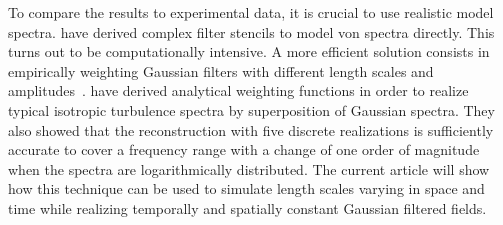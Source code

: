 To compare the results to experimental data, it is crucial to use realistic model spectra. \citet{dieste_random_2012} have derived complex filter stencils to model von \Karman spectra directly. This turns out to be computationally intensive. A more efficient solution consists in empirically weighting Gaussian filters with different length scales and amplitudes~\cite{kim_advanced_2015,hainaut_caa_2016}. \citet{wohlbrandt_analytical_2016} have derived analytical weighting functions in order to realize typical isotropic turbulence spectra by superposition of Gaussian spectra. They also showed that the reconstruction with five discrete realizations is sufficiently accurate to cover a frequency range with a change of one order of magnitude when the spectra are logarithmically distributed.  The current article will show how this technique can be used to simulate length scales varying in space and time while realizing temporally and spatially constant Gaussian filtered fields.


